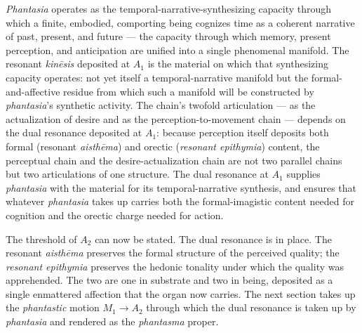 \documentclass{article}
\begin{document}
\textit{Phantasia} operates as the temporal-narrative-synthesizing capacity through which a finite, embodied, comporting being cognizes time as a coherent narrative of past, present, and future --- the capacity through which memory, present perception, and anticipation are unified into a single phenomenal manifold. The resonant \textit{kinēsis} deposited at $A_1$ is the material on which that synthesizing capacity operates: not yet itself a temporal-narrative manifold but the formal-and-affective residue from which such a manifold will be constructed by \textit{phantasia}'s synthetic activity. The chain's twofold articulation --- as the actualization of desire and as the perception-to-movement chain --- depends on the dual resonance deposited at $A_1$: because perception itself deposits both formal (resonant \textit{aisthēma}) and orectic (\textit{resonant epithymia}) content, the perceptual chain and the desire-actualization chain are not two parallel chains but two articulations of one structure. The dual resonance at $A_1$ supplies \textit{phantasia} with the material for its temporal-narrative synthesis, and ensures that whatever \textit{phantasia} takes up carries both the formal-imagistic content needed for cognition and the orectic charge needed for action.

The threshold of $A_2$ can now be stated. The dual resonance is in place. The resonant \textit{aisthēma} preserves the formal structure of the perceived quality; the \textit{resonant epithymia} preserves the hedonic tonality under which the quality was apprehended. The two are one in substrate and two in being, deposited as a single enmattered affection that the organ now carries. The next section takes up the \textit{phantastic} motion $M_1 \rightarrow A_2$ through which the dual resonance is taken up by \textit{phantasia} and rendered as the \textit{phantasma} proper.
\end{document}
